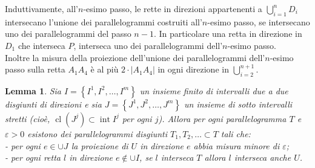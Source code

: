 \documentclass[a4paper, twoside,openright]{article}
\newcommand{\<}{\langle}
\renewcommand{\>}{\rangle}
\newtheorem{lemma}[teo]{Lemma}
\begin{document}
Induttivamente, all'$n$-esimo passo, le rette in direzioni appartenenti a $\bigcup_{i=1}^n D_i$ intersecano l'unione dei parallelogrammi costruiti all'$n$-esimo passo, se intersecano uno dei parallelogrammi del passo $n-1$. In particolare una retta in direzione in $D_1$ che interseca $P$, interseca uno dei parallelogrammi dell'$n$-esimo passo.\\
Inoltre la misura della proiezione dell'unione dei parallelogrammi dell'$n$-esimo passo sulla retta $A_{1} A_{4}$ è al più $2 \cdot\left|A_{1} A_{4}\right|$ in ogni direzione in $\bigcup_{i=2}^{n+1}$.\\

\begin{lemma}
	Sia $I=\left\{I^{1}, I^{2}, \ldots, I^{m}\right\}$ un insieme finito di intervalli due a due disgiunti di direzioni e sia $J=\left\{J^{1}, J^{2}, \ldots, J^{m}\right\}$ un insieme di sotto intervalli stretti (cioè, $\operatorname{cl}\left(J^{j}\right) \subset \operatorname{int} I^{j}$ per ogni $j$). Allora per ogni parallelogramma $T$ e $\varepsilon>0$ esistono dei parallelogrammi disgiunti $T_{1}, T_{2}, \ldots \subset T$ tali che:\\
	- per ogni $e \in \cup J$ la proiezione di $U$ in direzione $e$ abbia misura minore di $\varepsilon$;\\
	- per ogni retta $l$ in direzione $e \notin \cup I$, se $l$ interseca $T$ allora $l$ interseca anche $U$.	
\end{lemma}	
\end{document}
